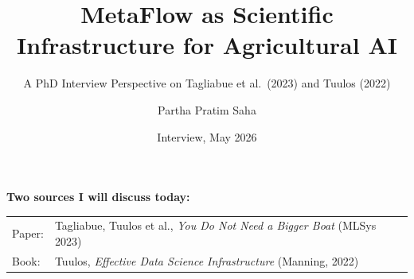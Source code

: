 \documentclass[10pt,aspectratio=169]{beamer}
\title[MetaFlow: Interview Deep-Dive]{MetaFlow as Scientific Infrastructure for Agricultural AI}
\subtitle{A PhD Interview Perspective on Tagliabue et al.\ (2023) and Tuulos (2022)}
\author{Partha Pratim Saha}
\institute{GreenFieldData MSCA PhD-L\\UCBLyon1 / UniMI}
\date{Interview, May 2026}
\begin{document}
\begin{frame}
\titlepage
\vspace{-0.3cm}
\begin{center}
\small
\textbf{Two sources I will discuss today:}\\
\begin{tabular}{ll}
Paper: & Tagliabue, Tuulos et al., \emph{You Do Not Need a Bigger Boat} (MLSys 2023)\\
Book:  & Tuulos, \emph{Effective Data Science Infrastructure} (Manning, 2022)\\
\end{tabular}
\end{center}
\end{frame}
\end{document}
